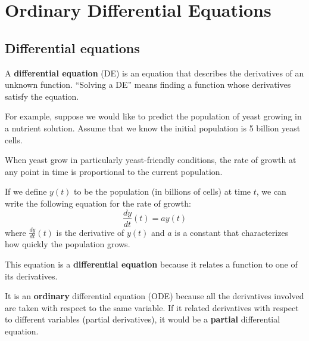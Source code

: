 \documentclass[
]{book}
\numberwithin{Answer}{chapter}
\numberwithin{Exercise}{chapter}
\begin{document}




\chapter{Ordinary Differential Equations}


\section{Differential equations}
\label{diffeq}

A {\bf differential equation} (DE) is an equation that describes the
derivatives of an unknown function.  ``Solving a DE'' means finding a
function whose derivatives satisfy the equation.

For example, suppose we would like to predict the population of yeast growing in a nutrient solution.  Assume that we know the initial population is 5 billion yeast cells.

When yeast grow in particularly yeast-friendly
conditions, the rate of growth at any point in time is proportional to
the current population.

If we define $y(t)$ to be the population (in billions of cells) at 
time $t$, we can write the following equation for the rate of growth:
%
\begin{equation}
\label{eq:exp_growth}
\frac{dy}{dt}(t) = a y(t)
\end{equation}
%
where $\frac{dy}{dt}(t)$ is the derivative of $y(t)$ and
$a$ is a constant that characterizes how quickly the population
grows.

This equation is a {\bf differential equation} because it relates a function to one of its derivatives.

It is an {\bf ordinary} differential equation (ODE) because all the
derivatives involved are taken with respect to the
same variable.
If it related derivatives with respect to
different variables (partial derivatives), it would be a {\bf partial}
differential equation.

\end{document}
